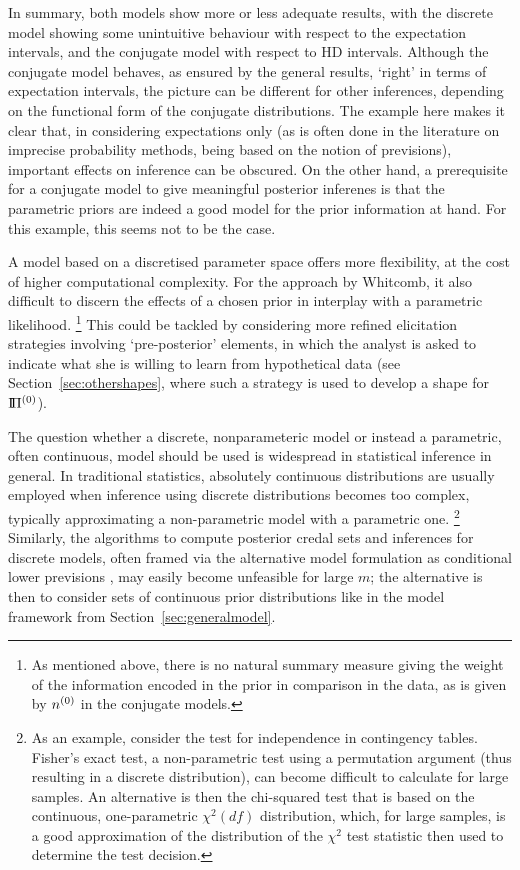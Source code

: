 In summary, both models show more or less adequate results,
with the discrete model showing some unintuitive behaviour with respect to the expectation intervals,
and the conjugate model with respect to HD intervals.
Although the conjugate model behaves, as ensured by the general results, `right' in terms of expectation intervals,
the picture can be different for other inferences, depending on the functional form of the conjugate distributions.
The example here makes it clear that, in considering expectations only
(as is often done in the literature on imprecise probability methods,
being based on the notion of previsions), important effects on inference can be obscured.
On the other hand,
a prerequisite for a conjugate model to give meaningful posterior inferenes is %
that the parametric priors are indeed a good model for the prior information at hand.
For this example, this seems not to be the case.

A model based on a discretised parameter space offers more flexibility,
at the cost of higher computational complexity.
For the approach by Whitcomb, it also difficult to discern the effects of a chosen prior
in interplay with a parametric likelihood.%
\footnote{As mentioned above, there is no natural summary measure
giving the weight of the information encoded in the prior in comparison in the data,
as is given by $n^{(0)}$ in the conjugate models.}
This could be tackled by considering more refined elicitation strategies involving `pre-posterior' elements,
in which the analyst is asked to indicate what she is willing to learn from hypothetical data
(see Section~\ref{sec:othershapes}, where such a strategy is used to develop a shape for $\text{I}\!\Pi^{(0)}$).

The question whether a discrete, nonparameteric model or instead a parametric, often continuous, model should be used
is widespread in statistical inference in general.
In traditional statistics, absolutely continuous distributions are usually employed
when inference using discrete distributions becomes too complex,
typically approximating a non-parametric model with a parametric one.%
\footnote{As an example, consider the test for independence in contingency tables.
Fisher's exact test, a non-parametric test using a permutation argument (thus resulting in a discrete distribution),
can become difficult to calculate for large samples.
An alternative is then the chi-squared test that is based on the continuous, one-parametric $\chi^2(df)$ distribution,
which, for large samples, is a good approximation of the distribution
of the $\chi^2$ test statistic then used to determine the test decision.}
Similarly, the algorithms to compute posterior credal sets and inferences for discrete models,
often framed via the alternative model formulation as conditional lower previsions
\parencite[see, e.g.,][]{itip-computation},
may easily become unfeasible for large $m$;
the alternative is then to consider sets of continuous prior distributions
like in the model framework from Section~\ref{sec:generalmodel}.


